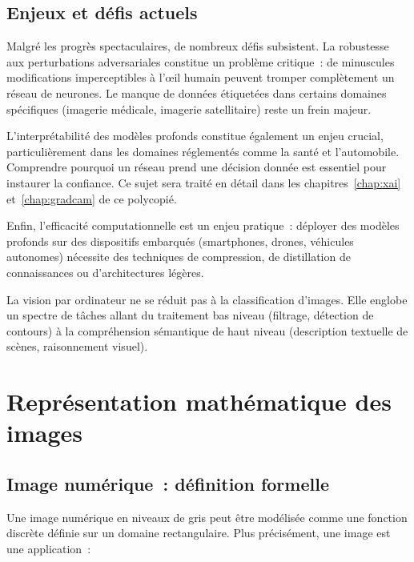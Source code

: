 \documentclass[a4paper,11pt,twoside]{book}
\begin{document}
\section{Enjeux et défis actuels}

Malgré les progrès spectaculaires, de nombreux défis subsistent. La robustesse aux perturbations adversariales constitue un problème critique~: de minuscules modifications imperceptibles à l'œil humain peuvent tromper complètement un réseau de neurones. Le manque de données étiquetées dans certains domaines spécifiques (imagerie médicale, imagerie satellitaire) reste un frein majeur.

L'interprétabilité des modèles profonds constitue également un enjeu crucial, particulièrement dans les domaines réglementés comme la santé et l'automobile. Comprendre pourquoi un réseau prend une décision donnée est essentiel pour instaurer la confiance. Ce sujet sera traité en détail dans les chapitres~\ref{chap:xai} et~\ref{chap:gradcam} de ce polycopié.

Enfin, l'efficacité computationnelle est un enjeu pratique~: déployer des modèles profonds sur des dispositifs embarqués (smartphones, drones, véhicules autonomes) nécessite des techniques de compression, de distillation de connaissances ou d'architectures légères.

\begin{notebox}
La vision par ordinateur ne se réduit pas à la classification d'images. Elle englobe un spectre de tâches allant du traitement bas niveau (filtrage, détection de contours) à la compréhension sémantique de haut niveau (description textuelle de scènes, raisonnement visuel).
\end{notebox}


\chapter{Représentation mathématique des images}

\section{Image numérique~: définition formelle}

Une image numérique en niveaux de gris peut être modélisée comme une fonction discrète définie sur un domaine rectangulaire. Plus précisément, une image est une application~:
\end{document}
